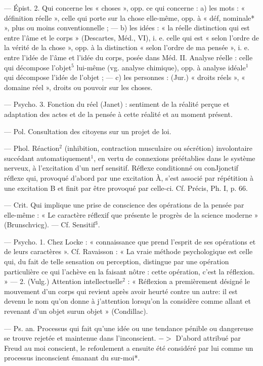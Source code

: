 \begin{itemize}[leftmargin=1cm, label=, itemsep=1pt]
— Épist. 2. Qui concerne les
« choses », opp. ce qui concerne :
a) les mots : « définition réelle », celle
qui porte sur la chose elle-même,
opp. à « déf, nominale* », plus ou
moins conventionnelle ; — b) les
idées : « la réelle distinction qui est
entre l’âme et le corps » (Descartes,
Méd., VI), i. e. celle qui est « selon
l’ordre de la vérité de la chose »,
opp. à la distinction « selon l’ordre
de ma pensée », i. e. entre l’idée de
l’âme et l’idée du corps, posée dans
Méd. II. Analyse réelle : celle qui
décompose l'objet$^5$ lui-même (vg.
analyse chimique), opp. à analyse
idéale$^1$ qui décompose l'idée de
l’objet ; — c) les personnes : (Jur.)
« droits réels », « domaine réel »,
droits ou pouvoir sur les choses.

— Psycho. 3. Fonction du réel
(Janet) : sentiment de la réalité
perçue et adaptation des actes et
de la pensée à cette réalité et au
moment présent.

 — Pol. Consultation des
citoyens sur un projet de loi.

 — Phol. Réaction$^2$ (inhibition, contraction musculaire ou sécrétion) involontaire succédant automatiquement$^1$, en vertu de connexions préétablies dans le système
nerveux, à l'excitation d’un nerf
sensitif. Réflexe conditionné ou conJjonctif réflexe qui, provoqué
d’abord par une excitation À, s’est
associé par répétition à une excitation B et finit par être provoqué par
celle-ci. Cf. Précis, Ph. I, p. 66.

 — Crit. Qui implique une
prise de conscience des opérations de
la pensée par elle-même : « Le caractère réflexif que présente le progrès
de la science moderne » (Brunschvicg). — Cf. Sensitif$^3$.

 — Psycho. 1. Chez Locke :
« connaissance que prend l'esprit de
ses opérations et de leurs caractères ». Cf. Ravaisson : « La vraie
méthode psychologique est celle
qui, du fait de telle sensation ou
perception, distingue par une opération particulière ce qui l’achève en
la faisant nôtre : cette opération,
c'est la réflexion. » — 2. (Vulg.)
Attention intellectuelle$^2$ : « Réflexion
a premièrement désigné le mouvement d’un corps qui revient après
avoir heurté contre un autre: il est
devenu le nom qu'on donne à j'attention lorsqu'on la considère comme
allant et revenant d’un objet surun
objet » (Condillac).

 — Ps. an. Processus
qui fait qu’une idée ou une tendance
pénible ou dangereuse se trouve
rejetée et maintenue dans l’inconscient. $->$ D'abord attribué par
Freud au moi conscient, le refoulement a ensuite été considéré par lui
comme un processus inconscient
émanant du sur-moi*.


\end{itemize}

